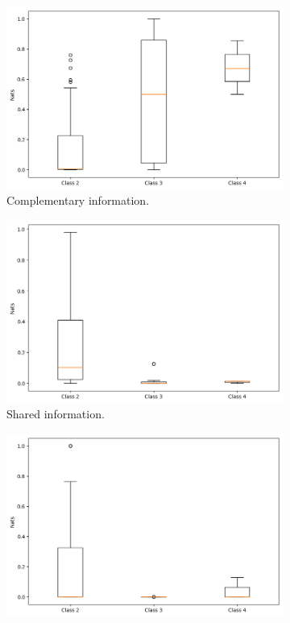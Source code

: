 \documentclass[12pt]{article}
\begin{document}
\begin{figure}
\begin{subfigure}{.5\textwidth}
  \centering
  \includegraphics[width=.9\linewidth]{eca-box-ci}
  \caption{Complementary information.}
  \label{fig:eca-box-ci}
\end{subfigure}%
\begin{subfigure}{.5\textwidth}
  \centering
  \includegraphics[width=.9\linewidth]{eca-box-si}
  \caption{Shared information.}
  \label{fig:eca-box-si}
\end{subfigure}
\begin{subfigure}{.5\textwidth}
  \centering
  \includegraphics[width=.9\linewidth]{eca-box-ui-y}

\end{subfigure}
\end{figure}
\end{document}
